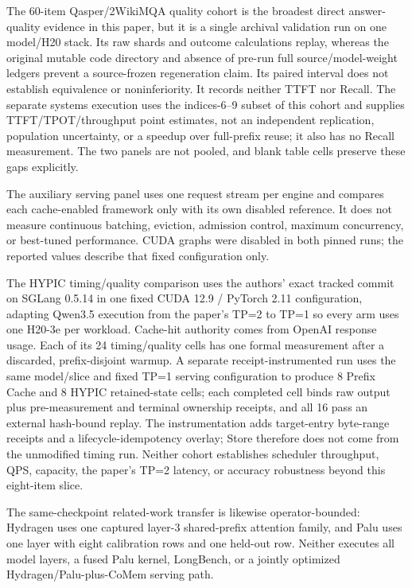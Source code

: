 \documentclass{article}
\begin{document}
The 60-item Qasper/2WikiMQA quality cohort is the broadest direct answer-quality
evidence in this paper, but it is a single archival validation run on one
model/H20 stack.  Its raw shards and outcome calculations replay, whereas the
original mutable code directory and absence of pre-run full source/model-weight
ledgers prevent a source-frozen regeneration claim.  Its paired interval does
not establish equivalence or noninferiority.  It records neither TTFT nor
Recall.  The separate systems execution uses the indices-6--9 subset of this
cohort and supplies TTFT/TPOT/throughput point estimates, not an independent
replication, population uncertainty, or a speedup over full-prefix reuse; it
also has no Recall measurement.  The two panels are not pooled, and blank
table cells preserve these gaps explicitly.

The auxiliary serving panel uses one request stream per engine and compares
each cache-enabled framework only with its own disabled reference.  It does not
measure continuous batching, eviction, admission control, maximum concurrency,
or best-tuned performance.  CUDA graphs were disabled in both pinned runs; the
reported values describe that fixed configuration only.

The HYPIC timing/quality comparison uses the authors' exact tracked commit on
SGLang 0.5.14 in one fixed CUDA 12.9 / PyTorch 2.11 configuration, adapting
Qwen3.5 execution from the paper's TP=2 to TP=1 so every arm uses one H20-3e per
workload.  Cache-hit authority comes from OpenAI response usage.  Each of its 24
timing/quality cells has one formal measurement after a discarded,
prefix-disjoint warmup.  A separate receipt-instrumented run uses the same
model/slice and fixed TP=1 serving configuration to produce 8 Prefix Cache and
8 HYPIC retained-state cells; each completed cell binds raw output plus
pre-measurement and terminal ownership receipts, and all 16 pass an external
hash-bound replay.  The instrumentation adds target-entry byte-range receipts
and a lifecycle-idempotency overlay; Store therefore does not come from the
unmodified timing run.  Neither cohort establishes scheduler throughput, QPS,
capacity, the paper's TP=2 latency, or accuracy robustness beyond this
eight-item slice.

The same-checkpoint related-work transfer is likewise operator-bounded:
Hydragen uses one captured layer-3 shared-prefix attention family, and Palu
uses one layer with eight calibration rows and one held-out row.  Neither
executes all model layers, a fused Palu kernel, LongBench, or a jointly
optimized Hydragen/Palu-plus-CoMem serving path.
\end{document}
